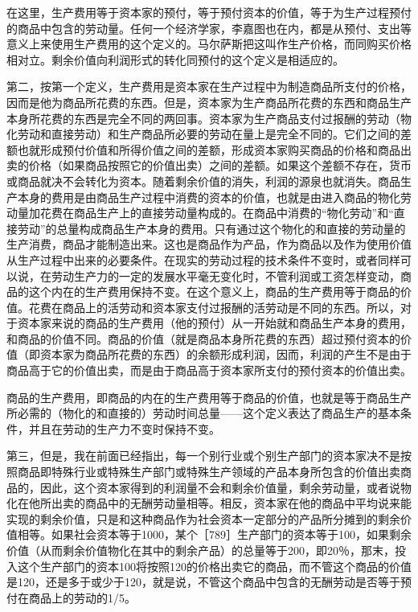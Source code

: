 在这里，生产费用等于资本家的预付，等于预付资本的价值，等于为生产过程预付的商品中包含的劳动量。任何一个经济学家，李嘉图也在内，都是从预付、支出等意义上来使用生产费用的这个定义的。马尔萨斯把这叫作生产价格，而同购买价格相对立。剩余价值向利润形式的转化同预付的这个定义是相适应的。

第二，按第一个定义，生产费用是资本家在生产过程中为制造商品所支付的价格，因而是他为商品所花费的东西。但是，资本家为生产商品所花费的东西和商品生产本身所花费的东西是完全不同的两回事。资本家为生产商品支付过报酬的劳动（物化劳动和直接劳动）和生产商品所必要的劳动在量上是完全不同的。它们之间的差额也就形成预付价值和所得价值之间的差额，形成资本家购买商品的价格和商品出卖的价格（如果商品按照它的价值出卖）之间的差额。如果这个差额不存在，货币或商品就决不会转化为资本。随着剩余价值的消失，利润的源泉也就消失。商品生产本身的费用是由商品生产过程中消费的资本的价值，也就是由进入商品的物化劳动量加花费在商品生产上的直接劳动量构成的。在商品中消费的“物化劳动”和“直接劳动”的总量构成商品生产本身的费用。只有通过这个物化的和直接的劳动量的生产消费，商品才能制造出来。这也是商品作为产品，作为商品以及作为使用价值从生产过程中出来的必要条件。在现实的劳动过程的技术条件不变时，或者同样可以说，在劳动生产力的一定的发展水平毫无变化时，不管利润或工资怎样变动，商品的这个内在的生产费用保持不变。在这个意义上，商品的生产费用等于商品的价值。花费在商品上的活劳动和资本家支付过报酬的活劳动是不同的东西。所以，对于资本家来说的商品的生产费用（他的预付）从一开始就和商品生产本身的费用，和商品的价值不同。商品的价值（就是商品本身所花费的东西）超过预付资本的价值（即资本家为商品所花费的东西）的余额形成利润，因而，利润的产生不是由于商品高于它的价值出卖，而是由于商品高于资本家所支付的预付资本的价值出卖。

商品的生产费用，即商品的内在的生产费用等于商品的价值，也就是等于商品生产所必需的（物化的和直接的）劳动时间总量——这个定义表达了商品生产的基本条件，并且在劳动的生产力不变时保持不变。

第三，但是，我在前面已经指出，每一个别行业或个别生产部门的资本家决不是按照商品即特殊行业或特殊生产部门或特殊生产领域的产品本身所包含的价值出卖商品的，因此，这个资本家得到的利润量不会和剩余价值量，剩余劳动量，或者说物化在他所出卖的商品中的无酬劳动量相等。相反，资本家在他的商品中平均说来能实现的剩余价值，只是和这种商品作为社会资本一定部分的产品所分摊到的剩余价值相等。如果社会资本等于1000，某个［789］生产部门的资本等于100，如果剩余价值（从而剩余价值物化在其中的剩余产品）的总量等于200，即20％，那末，投入这个生产部门的资本100将按照120的价格出卖它的商品，而不管这个商品的价值是120，还是多于或少于120，就是说，不管这个商品中包含的无酬劳动是否等于预付在商品上的劳动的1/5。

